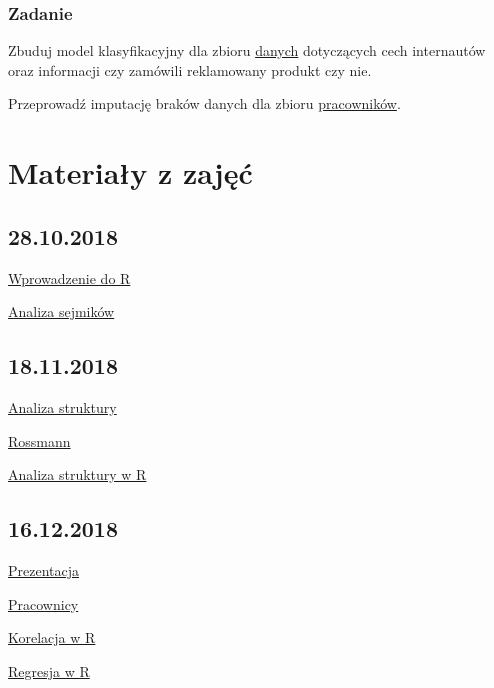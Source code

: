 \documentclass[]{book}
\begin{document}
\subsection{Zadanie}\label{zadanie-4}

Zbuduj model klasyfikacyjny dla zbioru
\href{data/Social_Network_Ads.csv}{danych} dotyczących cech internautów
oraz informacji czy zamówili reklamowany produkt czy nie.

Przeprowadź imputację braków danych dla zbioru
\href{data/pracownicy.RData}{pracowników}.

\chapter{Materiały z zajęć}\label{materiay-z-zajec}

\section{28.10.2018}\label{section}

\href{res/skrypt20181028.R}{Wprowadzenie do R}

\href{res/analiza20181028.R}{Analiza sejmików}

\section{18.11.2018}\label{section-1}

\href{https://departmentofstatisticspue.github.io/statystyka-opisowa/analiza-struktury.html}{Analiza
struktury}

\href{data/rossmann.xlsx}{Rossmann}

\href{res/zajecia20181118.R}{Analiza struktury w R}

\section{16.12.2018}\label{section-2}

\href{prezentacje/03.html}{Prezentacja}

\href{data/Salary_Data.csv}{Pracownicy}

\href{res/korelacje20181216.R}{Korelacja w R}

\href{res/regresja20181216.Rmd}{Regresja w R}
\end{document}

